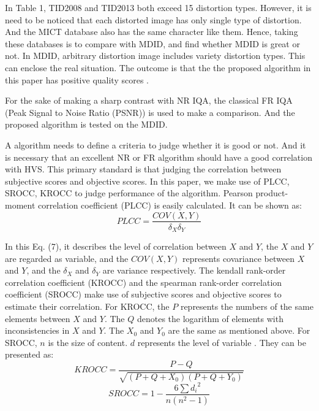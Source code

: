 In Table 1, TID2008 and TID2013 both exceed 15 distortion types. However, it is need to be noticed that each distorted image has only single type of distortion. And the MICT database also has the same character like them. Hence, taking these databases is to compare with MDID, and find whether MDID is great or not. In MDID, arbitrary distortion image includes variety distortion types. This can enclose the real situation. The outcome is that the the proposed algorithm in this paper has positive quality scores \cite{b24}.

For the sake of making a sharp contrast with NR IQA, the classical FR IQA (Peak Signal to Noise Ratio (PSNR)) is used to make a comparison. And the proposed algorithm is tested on the MDID.


\par A algorithm needs to define a criteria to judge whether it is good or not. And it is necessary that an excellent NR or FR algorithm should have a good correlation with HVS. This primary standard is that judging the correlation between subjective scores and objective scores. In this paper, we make use of PLCC, SROCC, KROCC \cite{b25,b26,b27,b28,b29}to judge performance of the algorithm. Pearson product-moment correlation coefficient (PLCC) is easily calculated. It can be shown as:
\begin{equation}
PLCC=\frac{COV(X,Y)}{\delta_{X}\delta_{Y}}
\end{equation}
\par In this Eq. (7), it describes the level of correlation between $X$ and $Y$, the $X$ and $Y$ are regarded as variable, and the $COV(X,Y)$ represents covariance between $X$ and $Y$, and the $\delta_{X}$ and $ \delta_{Y}$ are variance respectively.
The kendall rank-order correlation coefficient (KROCC) and the spearman rank-order correlation coefficient (SROCC) make use of subjective scores and objective scores to estimate their correlation. For KROCC, the $P$ represents the numbers of the same elements between $X$ and $Y$. The $Q$ denotes the logarithm of elements with inconsistencies in $X$ and $Y$. The $X_{0}$ and $Y_{0}$ are the same as mentioned above. For SROCC, $n$ is the size of content. $d$ represents the level of variable \cite{b30,b31,b32}. They can be presented as:
\begin{equation}
KROCC = \frac{P - Q}{\sqrt{(P+Q+X_{0})(P+Q+Y_{0})}}
\end{equation}
\begin{equation}
SROCC = 1 - \frac{6\sum{{d_i}^2}}{n(n^2 - 1)}
\end{equation}

